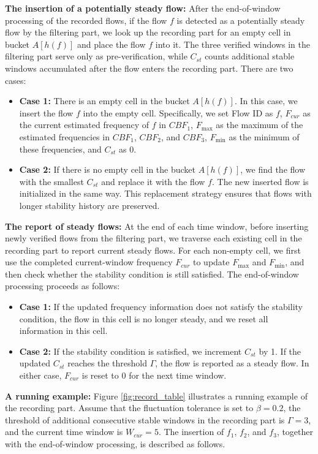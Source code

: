 \documentclass[preprint,12pt]{elsarticle}
\begin{document}
\textbf{The insertion of a potentially steady flow:} After the end-of-window processing of the recorded flows, if the flow $f$ is detected as a potentially steady flow by the filtering part, we look up the recording part for an empty cell in bucket $A[h(f)]$ and place the flow $f$ into it. The three verified windows in the filtering part serve only as pre-verification, while $C_{st}$ counts additional stable windows accumulated after the flow enters the recording part. There are two cases:
\begin{itemize}
    \item \textbf{Case 1:} There is an empty cell in the bucket $A[h(f)]$. In this case, we insert the flow $f$ into the empty cell. Specifically, we set Flow ID as $f$, $F_{cur}$ as the current estimated frequency of $f$ in $CBF_1$, $F_{\max}$ as the maximum of the estimated frequencies in $CBF_1$, $CBF_2$, and $CBF_3$, $F_{\min}$ as the minimum of these frequencies, and $C_{st}$ as 0.
    \item \textbf{Case 2:} If there is no empty cell in the bucket $A[h(f)]$, we find the flow with the smallest $C_{st}$ and replace it with the flow $f$. The new inserted flow is initialized in the same way. This replacement strategy ensures that flows with longer stability history are preserved.
\end{itemize}

\textbf{The report of steady flows:} At the end of each time window, before inserting newly verified flows from the filtering part, we traverse each existing cell in the recording part to report current steady flows. For each non-empty cell, we first use the completed current-window frequency $F_{cur}$ to update $F_{\max}$ and $F_{\min}$, and then check whether the stability condition is still satisfied. The end-of-window processing proceeds as follows:
\begin{itemize}
    \item \textbf{Case 1:} If the updated frequency information does not satisfy the stability condition, the flow in this cell is no longer steady, and we reset all information in this cell.
    \item \textbf{Case 2:} If the stability condition is satisfied, we increment $C_{st}$ by 1. If the updated $C_{st}$ reaches the threshold $\Gamma$, the flow is reported as a steady flow. In either case, $F_{cur}$ is reset to 0 for the next time window.
\end{itemize}

\textbf{A running example:} Figure \ref{fig:record_table} illustrates a running example of the recording part. Assume that the fluctuation tolerance is set to $\beta = 0.2$, the threshold of additional consecutive stable windows in the recording part is $\Gamma = 3$, and the current time window is $W_{cur} = 5$. The insertion of $f_1$, $f_2$, and $f_3$, together with the end-of-window processing, is described as follows.
\end{document}
